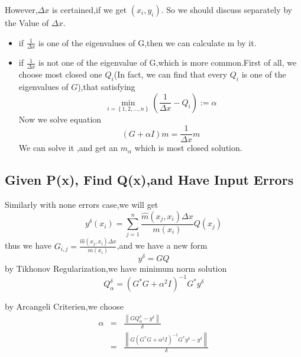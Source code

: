 \documentclass[a4paper]{article}
\newcommand{\assign}{:=}
\newenvironment{itemizedot}{\begin{itemize} \renewcommand{\labelitemi}{$\bullet$}\renewcommand{\labelitemii}{$\bullet$}\renewcommand{\labelitemiii}{$\bullet$}\renewcommand{\labelitemiv}{$\bullet$}}{\end{itemize}}
\begin{document}
However,$\Delta x$ is certained,if we get $(x_i, y_i)$. So we should discuss
separately by the Value of $\Delta x$.
\begin{itemizedot}
  \item if $\frac{1}{\Delta x }$ is one of the eigenvalues of G,then we
  can calculate m by it.

  \item if $\frac{1}{\Delta x}$ is not one of the eigenvalue of G,which is
  more common.First of all, we choose most closed one $Q_i$(In fact, we can
  find that every $Q_i$ is one of the eigenvalues of $G$),that satisfying
  \begin{equation}
    \min_{i = \left\{ 1, 2, \ldots, n \right\}} \left( \frac{1}{\Delta x} -
    Q_i \right) \assign \alpha
  \end{equation}
  Now we solve equation
  \begin{equation}
    \left( G + \alpha I \right) m = \frac{1}{\Delta x} m
  \end{equation}
  We can solve it ,and get an $m_{\alpha}$ which is most closed solution.


\end{itemizedot}


\subsection{Given P(x), Find Q(x),and Have Input Errors}

Similarly with none errors case,we will get
\begin{equation}
  y^{\delta} \left( x_i \right) = \sum^n_{j = 1} \frac{\hat{m} \left( x_j, x_i
  \right) \Delta x}{m \left( x_i \right)} Q \left( x_j \right)
\end{equation}
thus we have $G_{i, j} = \frac{\hat{m} \left( x_j, x_i \right) \Delta x}{m
\left( x_i \right)}$,and we have a new form
\begin{equation}
  y^{\delta} = G Q
\end{equation}
by Tikhonov Regularization,we have minimum norm solution
\begin{equation}
  Q^{\delta}_{\alpha} = \left( G^{\ast} G + \alpha^2 I^{} \right)^{- 1}
  G^{\ast} y^{\delta}
\end{equation}


by Arcangeli Criterien,we choose
\begin{eqnarray}
  \alpha & = & \frac{\left\| G Q_{\alpha}^{\delta} - y^{\delta}
  \right\|}{\delta} \\
  & = & \frac{\left\| G \left( G^{\ast} G + \alpha^2 I^{} \right)^{- 1}
  G^{\ast} y^{\delta} - y^{\delta} \right\|}{\delta}
\end{eqnarray}
\end{document}
